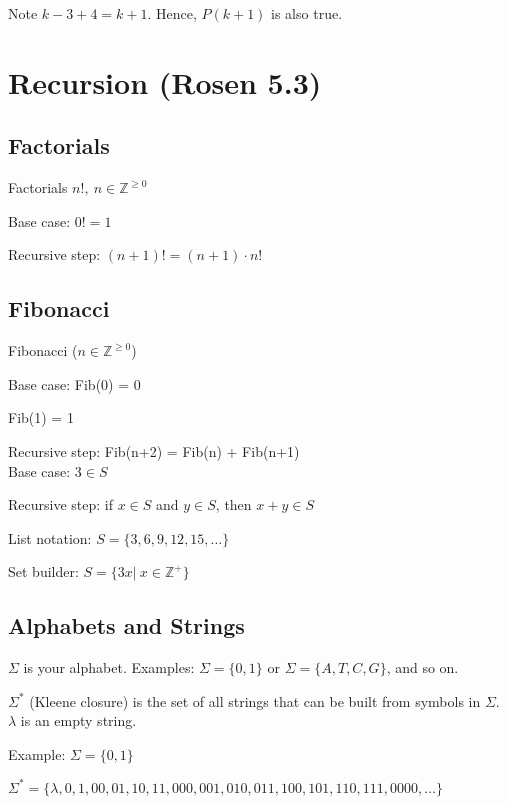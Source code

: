\documentclass[english,openany]{book}
\begin{document}
    Note $k - 3 + 4 = k + 1$. Hence, $P(k+1)$ is also true.

    \newpage

    \section{Recursion (Rosen 5.3)}

    \subsection{Factorials}

    Factorials $n!,\ n \in \mathbb Z^{\geq 0}$

    Base case: $0! = 1$

    Recursive step: $(n+1)! = (n+1) \cdot n!$\\

    \subsection{Fibonacci}

    Fibonacci ($n \in \mathbb Z^{\geq 0}$)

    Base case: Fib(0) = 0

    Fib(1) = 1

    Recursive step: Fib(n+2) = Fib(n) + Fib(n+1)\\

    Base case: $3 \in S$

    Recursive step:
    \qquad if $x \in S$ and $y \in S$, then $x+y \in S$

    List notation: $S =\{3, 6, 9, 12, 15, \dots\} $

    Set builder: $S = \{3x |\ x \in \mathbb Z^+\}$\\

    \subsection{Alphabets and Strings}

    $\Sigma$ is your alphabet. Examples: $\Sigma = \{0,1\}$  or $\Sigma = \{A,T,C,G\}$, and so on.

    $\Sigma^*$ (Kleene closure) is the set of all strings that can be built from symbols in $\Sigma$. $\lambda$ is an empty string.

    Example: $\Sigma = \{0,1\}$

    $\Sigma^* = \{\lambda, 0, 1, 00, 01, 10, 11, 000, 001, 010, 011, 100, 101, 110, 111, 0000, \dots \}$
\end{document}
